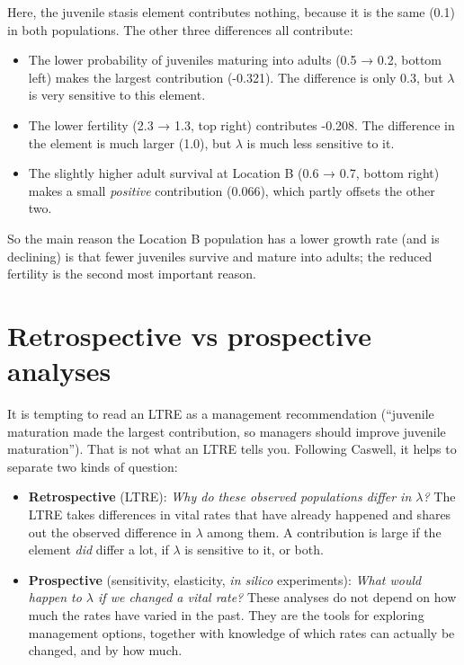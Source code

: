\documentclass[
  a4paper]{book}
\providecommand{\tightlist}{%
  \setlength{\itemsep}{0pt}\setlength{\parskip}{0pt}}
\begin{document}
Here, the juvenile stasis element contributes nothing, because it is the same (0.1) in both populations. The other three differences all contribute:

\begin{itemize}
\tightlist
\item
  The lower probability of juveniles maturing into adults (0.5 → 0.2, bottom left) makes the largest contribution (-0.321). The difference is only 0.3, but \(\lambda\) is very sensitive to this element.
\item
  The lower fertility (2.3 → 1.3, top right) contributes -0.208. The difference in the element is much larger (1.0), but \(\lambda\) is much less sensitive to it.
\item
  The slightly higher adult survival at Location B (0.6 → 0.7, bottom right) makes a small \emph{positive} contribution (0.066), which partly offsets the other two.
\end{itemize}

So the main reason the Location B population has a lower growth rate (and is declining) is that fewer juveniles survive and mature into adults; the reduced fertility is the second most important reason.

\section{Retrospective vs prospective analyses}\label{retrospective-vs-prospective-analyses}

It is tempting to read an LTRE as a management recommendation (``juvenile maturation made the largest contribution, so managers should improve juvenile maturation''). That is not what an LTRE tells you. Following Caswell, it helps to separate two kinds of question:

\begin{itemize}
\tightlist
\item
  \textbf{Retrospective} (LTRE): \emph{Why do these observed populations differ in \(\lambda\)?} The LTRE takes differences in vital rates that have already happened and shares out the observed difference in \(\lambda\) among them. A contribution is large if the element \emph{did} differ a lot, if \(\lambda\) is sensitive to it, or both.
\item
  \textbf{Prospective} (sensitivity, elasticity, \emph{in silico} experiments): \emph{What would happen to \(\lambda\) if we changed a vital rate?} These analyses do not depend on how much the rates have varied in the past. They are the tools for exploring management options, together with knowledge of which rates can actually be changed, and by how much.
\end{itemize}
\end{document}
